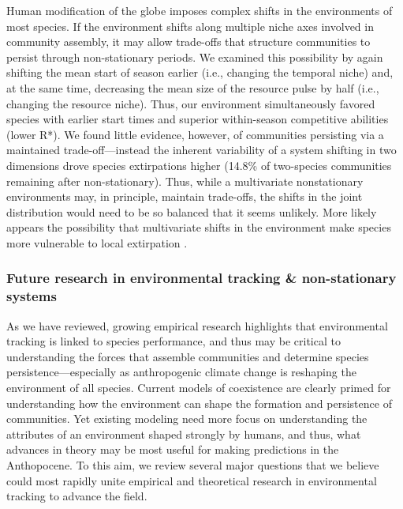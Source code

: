 \documentclass[11pt,letterpaper]{article}
\begin{document}
Human modification of the globe imposes complex shifts in the environments of most species. If the environment shifts along multiple niche axes involved in community assembly, it may allow trade-offs that structure communities to persist through non-stationary periods. We examined this possibility by again shifting the mean start of season earlier (i.e., changing the temporal niche) and, at the same time, decreasing the mean size of the resource pulse by half (i.e., changing the resource niche). Thus, our environment simultaneously favored species with earlier start times and superior within-season competitive abilities (lower R*). We found little evidence, however, of communities persisting via a maintained trade-off---instead the inherent variability of a system shifting in two dimensions drove species extirpations higher (14.8\% of two-species communities remaining after non-stationary). Thus, while a multivariate nonstationary environments may, in principle, maintain trade-offs, the shifts in the joint distribution would need to be so balanced that it seems unlikely. More likely appears the possibility that multivariate shifts in the environment make species more vulnerable to local extirpation \citep{sixthectinction2011,IPCC:2014sm}.

\subsubsection{Future research in environmental tracking \& non-stationary systems}
As we have reviewed, growing empirical research highlights that environmental tracking is linked to species performance, and thus may be critical to understanding the forces that assemble communities and determine species persistence---especially as anthropogenic climate change is reshaping the environment of all species. Current models of coexistence are clearly primed for understanding how the environment can shape the formation and persistence of communities. Yet existing modeling need more focus on understanding the attributes of an environment shaped strongly by humans, and thus, what advances in theory may be most useful for making predictions in the Anthopocene. To this aim, we review several major questions that we believe could most rapidly unite empirical and theoretical research in environmental tracking to advance the field.\\ %
\end{document}
